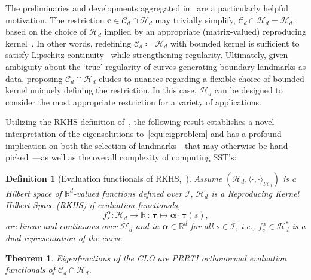 \documentclass[pdflatex,iicol]{sn-jnl}%
\theoremstyle{thmstyleone}%
\newtheorem{theorem}{Theorem}%
\theoremstyle{thmstyletwo}%
\theoremstyle{thmstylethree}%
\newtheorem{definition}{Definition}%
\begin{document}
The preliminaries and developments aggregated in~\cite{fiedler2023lipschitz, alpay2021new} are a particularly helpful motivation. The restriction $\boldsymbol{c} \in \mathcal{C}_d \cap \mathcal{H}_d$ may trivially simplify, $\mathcal{C}_d \cap \mathcal{H}_d = \mathcal{H}_d$, based on the choice of $\mathcal{H}_d$ implied by an appropriate (matrix-valued) reproducing kernel~\cite{drake2022implicit}. In other words, redefining $\mathcal{C}_d \coloneqq \mathcal{H}_d$ with bounded kernel is sufficient to satisfy Lipschitz continuity~\cite{fiedler2023lipschitz, alpay2021new} while strengthening regularity. Ultimately, given ambiguity about the `true' regularity of curves generating boundary landmarks as data, proposing $ \mathcal{C}_d \cap \mathcal{H}_d$ eludes to nuances regarding a flexible choice of bounded kernel uniquely defining the restriction. In this case, $\mathcal{H}_d$ can be designed to consider the most appropriate restriction for a variety of applications.

Utilizing the RKHS definition of~\cite{micheli2013matrix}, the following result establishes a novel interpretation of the eigensolutions to~\eqref{equ:eigproblem} and has a profound implication on both the selection of landmarks---that may otherwise be hand-picked~\cite{kendall2009shape}---as well as the overall complexity of computing SST's:

\begin{definition}[Evaluation functionals of RKHS,~\cite{micheli2013matrix}] \label{def:eval_func}
    Assume $(\mathcal{H}_d, \langle \cdot, \cdot \rangle_{\mathcal{H}_d})$ is a Hilbert space of $\mathbb{R}^d$-valued functions defined over $\mathcal{I}$, $\mathcal{H}_d$ is a Reproducing Kernel Hilbert Space (RKHS) if evaluation functionals,
    $$
    f_s^{\alpha}:\mathcal{H}_d \rightarrow \mathbb{R}\,:\,\boldsymbol{\tau} \mapsto \boldsymbol{\alpha} \cdot \boldsymbol{\tau}(s),
    $$
    are linear and continuous over $\mathcal{H}_d$ and in $\boldsymbol{\alpha}\in \mathbb{R}^d$ for all $s \in \mathcal{I}$, i.e., $f^{\alpha}_{s}\in \mathcal{H}^*_d$ is a dual representation of the curve.
\end{definition}

\begin{theorem} \label{theorem:eigfuncs}
    Eigenfunctions of the CLO are PRRTI orthonormal evaluation functionals of $\mathcal{C}_d \cap \mathcal{H}_d$.
\end{theorem}
\end{document}
